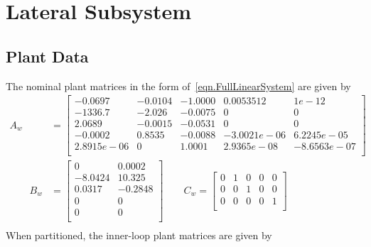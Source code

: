 \section{Lateral Subsystem}\label{sec.appendix_latr}

\subsection{Plant Data}

The nominal plant matrices in the form of\ \eqref{eqn.FullLinearSystem} are given by
\begin{equation*}
  \begin{split}
    A_{w} &=
    \begin{bmatrix}
      -0.0697 & -0.0104 & -1.0000 & 0.0053512 & 1e-12 \\
      -1336.7 & -2.026 & -0.0075 & 0 & 0 \\
      2.0689 & -0.0015 & -0.0531 & 0 & 0 \\
      -0.0002 & 0.8535 & -0.0088 & -3.0021e-06 & 6.2245e-05 \\
      2.8915e-06 & 0 & 1.0001 & 2.9365e-08 & -8.6563e-07 \\
    \end{bmatrix} \\
    \qquad
    B_{w} &=
    \begin{bmatrix}
      0 & 0.0002 \\
      -8.0424 & 10.325 \\
      0.0317 & -0.2848 \\
      0 & 0 \\
      0 & 0 \\
    \end{bmatrix}
    \qquad
    C_{w} =
    \begin{bmatrix}
      0 & 1 & 0 & 0 & 0 \\
      0 & 0 & 1 & 0 & 0 \\
      0 & 0 & 0 & 0 & 1 \\
    \end{bmatrix} \\
  \end{split}
\end{equation*}
When partitioned, the inner-loop plant matrices are given by
